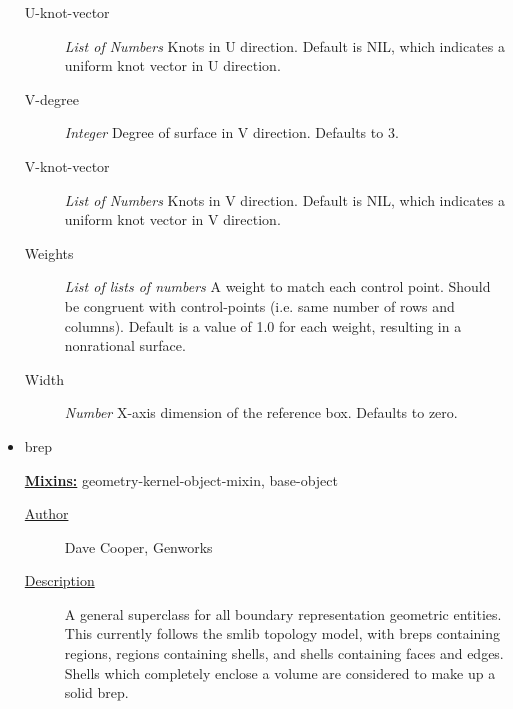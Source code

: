 \documentclass [11pt]{book}
\begin{document}
\begin{itemize}
\begin{description}
\item [U-knot-vector]
\emph{List of Numbers} Knots in U direction. Default is NIL, which indicates a uniform knot vector in U direction.


\item [V-degree]
\emph{Integer} Degree of surface in V direction. Defaults to 3.


\item [V-knot-vector]
\emph{List of Numbers} Knots in V direction. Default is NIL, which indicates a uniform knot vector in V direction.


\item [Weights]
\emph{List of lists of numbers} A weight to match each control point. Should be congruent with control-points
(i.e. same number of rows and columns). Default is a value of 1.0 for each weight, resulting in a nonrational surface.


\item [Width]
\emph{Number} X-axis dimension of the reference box. Defaults to zero.


\end{description}







\item {}brep


\textbf{
\underline{Mixins:}} geometry-kernel-object-mixin, base-object





\begin{description}

\item [
\underline{Author}]


Dave Cooper, Genworks



\item [
\underline{Description}]


A general superclass for all boundary representation geometric entities. 
This currently follows the smlib topology model, with breps containing regions, regions containing shells, 
and shells containing faces and edges. Shells which completely enclose a volume are considered 
to make up a solid brep.




\end{description}
\end{itemize}
\end{document}
